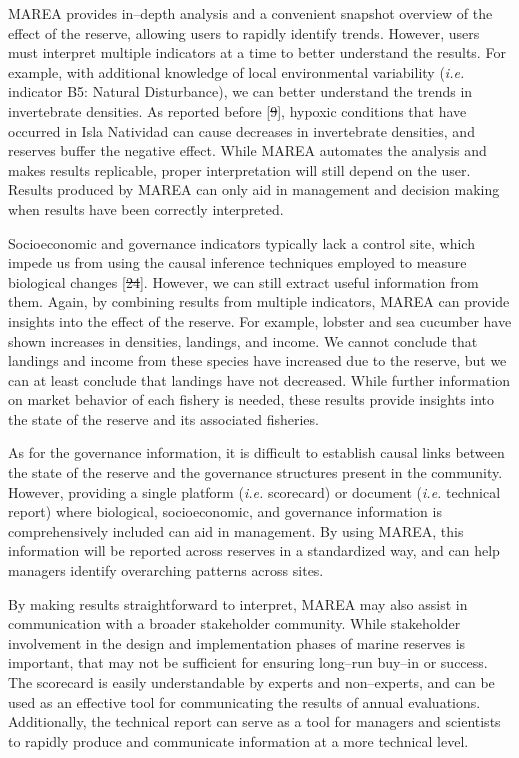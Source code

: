 \documentclass[12pt,]{article}
\providecommand{\DIFaddtex}[1]{{\protect\color{blue}\uwave{#1}}} %
\providecommand{\DIFdeltex}[1]{{\protect\color{red}\sout{#1}}}                      %
\providecommand{\DIFaddbegin}{} %
\providecommand{\DIFaddend}{} %
\providecommand{\DIFdelbegin}{} %
\providecommand{\DIFdelend}{} %
\providecommand{\DIFadd}[1]{\texorpdfstring{\DIFaddtex{#1}}{#1}} %
\providecommand{\DIFdel}[1]{\texorpdfstring{\DIFdeltex{#1}}{}} %
\newcommand{\DIFscaledelfig}{0.5}
\newlength{\DIFdelgraphicswidth} %
\newlength{\DIFdelgraphicsheight} %
\newcommand{\DIFaddincludegraphics}[2][]{{\color{blue}\fbox{\DIFOincludegraphics[#1]{#2}}}} %
\newcommand{\DIFdelincludegraphics}[2][]{%
\sbox{\DIFdelgraphicsbox}{\DIFOincludegraphics[#1]{#2}}%
\settoboxwidth{\DIFdelgraphicswidth}{\DIFdelgraphicsbox} %
\settoboxtotalheight{\DIFdelgraphicsheight}{\DIFdelgraphicsbox} %
\scalebox{\DIFscaledelfig}{%
\parbox[b]{\DIFdelgraphicswidth}{\usebox{\DIFdelgraphicsbox}\\[-\baselineskip] \rule{\DIFdelgraphicswidth}{0em}}\llap{\resizebox{\DIFdelgraphicswidth}{\DIFdelgraphicsheight}{%
\setlength{\unitlength}{\DIFdelgraphicswidth}%
\begin{picture}(1,1)%
\thicklines\linethickness{2pt} %
{\color[rgb]{1,0,0}\put(0,0){\framebox(1,1){}}}%
{\color[rgb]{1,0,0}\put(0,0){\line( 1,1){1}}}%
{\color[rgb]{1,0,0}\put(0,1){\line(1,-1){1}}}%
\end{picture}%
}\hspace*{3pt}}} %
} %
\DeclareRobustCommand{\DIFaddbegin}{\DIFOaddbegin \let\includegraphics\DIFaddincludegraphics} %
\DeclareRobustCommand{\DIFaddend}{\DIFOaddend \let\includegraphics\DIFOincludegraphics} %
\DeclareRobustCommand{\DIFdelbegin}{\DIFOdelbegin \let\includegraphics\DIFdelincludegraphics} %
\DeclareRobustCommand{\DIFdelend}{\DIFOaddend \let\includegraphics\DIFOincludegraphics} %
\begin{document}
MAREA provides in--depth analysis and a convenient snapshot overview of
the effect of the reserve, allowing users to rapidly identify trends.
However, users must interpret multiple indicators at a time to better
understand the results. For example, with additional knowledge of local
environmental variability (\emph{i.e.} indicator B5: Natural
Disturbance), we can better understand the trends in invertebrate
densities. As reported before {[}\DIFdelbegin \DIFdel{9}\DIFdelend \DIFaddbegin \DIFadd{8}\DIFaddend {]}, hypoxic conditions that have
occurred in Isla Natividad can cause decreases in invertebrate
densities, and reserves buffer the negative effect. While MAREA
automates the analysis and makes results replicable, proper
interpretation will still depend on the user. Results produced by MAREA
can only aid in management and decision making when results have been
correctly interpreted.

Socioeconomic and governance indicators typically lack a control site,
which impede us from using the causal inference techniques employed to
measure biological changes {[}\DIFdelbegin \DIFdel{24}\DIFdelend \DIFaddbegin \DIFadd{25}\DIFaddend {]}. However, we can still extract
useful information from them. Again, by combining results from multiple
indicators, MAREA can provide insights into the effect of the reserve.
For example, lobster and sea cucumber have shown increases in densities,
landings, and income. We cannot conclude that landings and income from
these species have increased due to the reserve, but we can at least
conclude that landings have not decreased. While further information on
market behavior of each fishery is needed, these results provide
insights into the state of the reserve and its associated fisheries.

As for the governance information, it is difficult to establish causal
links between the state of the reserve and the governance structures
present in the community. However, providing a single platform
(\emph{i.e.} scorecard) or document (\emph{i.e.} technical report) where
biological, socioeconomic, and governance information is comprehensively
included can aid in management. By using MAREA, this information will be
reported across reserves in a standardized way, and can help managers
identify overarching patterns across sites.

By making results straightforward to interpret, MAREA may also assist in
communication with a broader stakeholder community. While stakeholder
involvement in the design and implementation phases of marine reserves
is important, that may not be sufficient for ensuring long--run buy--in
or success. The scorecard is easily understandable by experts and
non--experts, and can be used as an effective tool for communicating the
results of annual evaluations. Additionally, the technical report can
serve as a tool for managers and scientists to rapidly produce and
communicate information at a more technical level.
\end{document}

